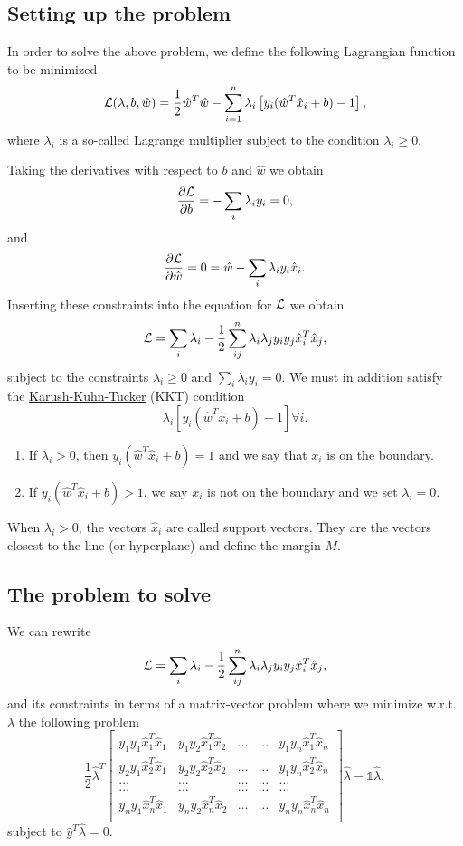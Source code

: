\documentclass[%
oneside,                 %
final,                   %
10pt]{article}
\begin{document}
\subsection{Setting up the problem}
In order to solve the above problem, we define the following Lagrangian function to be minimized 
\[
{\cal L}(\lambda,b,\hat{w})=\frac{1}{2}\hat{w}^T\hat{w}-\sum_{i=1}^n\lambda_i\left[y_i(\hat{w}^T\hat{x}_i+b)-1\right],
\]
where $\lambda_i$ is a so-called Lagrange multiplier subject to the condition $\lambda_i \geq 0$.

Taking the derivatives  with respect to $b$ and $\hat{w}$ we obtain 
\[
\frac{\partial {\cal L}}{\partial b} = -\sum_{i} \lambda_iy_i=0,
\]
and 
\[
\frac{\partial {\cal L}}{\partial \hat{w}} = 0 = \hat{w}-\sum_{i} \lambda_iy_i\hat{x}_i.
\]
Inserting these constraints into the equation for ${\cal L}$ we obtain
\[
{\cal L}=\sum_i\lambda_i-\frac{1}{2}\sum_{ij}^n\lambda_i\lambda_jy_iy_j\hat{x}_i^T\hat{x}_j,
\]
subject to the constraints $\lambda_i\geq 0$ and $\sum_i\lambda_iy_i=0$. 
We must in addition satisfy the \href{{https://en.wikipedia.org/wiki/Karush%
\[
\lambda_i\left[y_i(\hat{w}^T\hat{x}_i+b) -1\right] \forall i.
\]
\begin{enumerate}
\item If $\lambda_i > 0$, then $y_i(\hat{w}^T\hat{x}_i+b)=1$ and we say that $x_i$ is on the boundary.

\item If $y_i(\hat{w}^T\hat{x}_i+b)> 1$, we say $x_i$ is not on the boundary and we set $\lambda_i=0$. 
\end{enumerate}

\noindent
When $\lambda_i > 0$, the vectors $\hat{x}_i$ are called support vectors. They are the vectors closest to the line (or hyperplane) and define the margin $M$. 

\subsection{The problem to solve}

We can rewrite 
\[
{\cal L}=\sum_i\lambda_i-\frac{1}{2}\sum_{ij}^n\lambda_i\lambda_jy_iy_j\hat{x}_i^T\hat{x}_j,
\]
and its constraints in terms of a matrix-vector problem where we minimize w.r.t. $\lambda$ the following problem
\[
\frac{1}{2} \hat{\lambda}^T\begin{bmatrix} y_1y_1\hat{x}_1^T\hat{x}_1 & y_1y_2\hat{x}_1^T\hat{x}_2 & \dots & \dots & y_1y_n\hat{x}_1^T\hat{x}_n \\
y_2y_1\hat{x}_2^T\hat{x}_1 & y_2y_2\hat{x}_2^T\hat{x}_2 & \dots & \dots & y_1y_n\hat{x}_2^T\hat{x}_n \\
\dots & \dots & \dots & \dots & \dots \\
\dots & \dots & \dots & \dots & \dots \\
y_ny_1\hat{x}_n^T\hat{x}_1 & y_ny_2\hat{x}_n^T\hat{x}_2 & \dots & \dots & y_ny_n\hat{x}_n^T\hat{x}_n \\
\end{bmatrix}\hat{\lambda}-\mathbb{1}\hat{\lambda}, 
\]
subject to $\hat{y}^T\hat{\lambda}=0$. 
\end{document}

